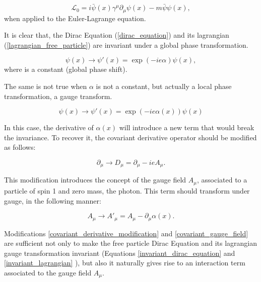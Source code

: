 \begin{equation}
    \mathcal{L_{\text{0}}} = i\bar{\psi}(x)\gamma^\mu\partial_\mu\psi(x)-m\bar{\psi}\psi(x),
    \label{lagrangian_free_particle}
\end{equation}
when applied to the Euler-Lagrange equation.

It is clear that, the Dirac Equation (\ref{dirac_equation}) and its lagrangian (\ref{lagrangian_free_particle}) are invariant under a global phase transformation.

\begin{equation}
    \psi(x) \rightarrow \psi'(x) = \exp{(-ie\alpha)}\psi(x),
    \label{global_phase_transformation}
\end{equation}
where is a constant (global phase shift).

The same is not true when $\alpha$ is not a constant, but actually a local phase transformation, a gauge transform.

\begin{equation}
    \psi(x) \rightarrow \psi'(x) = \exp{(-ie\alpha(x))}\psi(x)
    \label{local_phase_transformation}
\end{equation}

In this case, the derivative of $\alpha(x)$ will introduce a new term that would break the invariance. To recover it, the covariant derivative operator should be modified as follows:

\begin{equation}
    \partial_\mu \rightarrow D_\mu = \partial_\mu - ieA_\mu.
    \label{covariant_derivative_modification}
\end{equation}

This modification introduces the concept of the gauge field $A_\mu$, associated to a particle of spin 1 and zero mass, the photon. This term should transform under gauge, in the following manner:

\begin{equation}
    A_\mu \rightarrow A'_\mu = A_\mu - \partial_\mu\alpha(x).
    \label{covariant_gauge_field}
\end{equation}

Modifications \ref{covariant_derivative_modification} and \ref{covariant_gauge_field} are sufficient not only to make the free particle Dirac Equation and its lagrangian gauge transformation invariant (Equations \ref{invariant_dirac_equation} and \ref{invariant_lagrangian} ), but also it naturally gives rise to an interaction term associated to the gauge field $A_\mu$.

